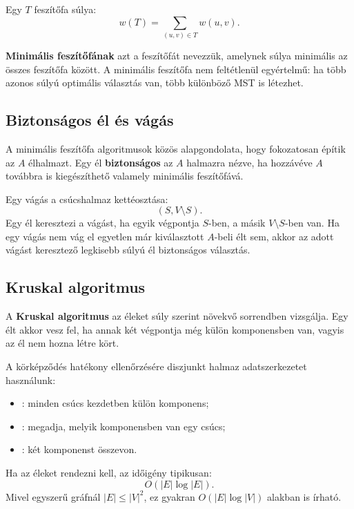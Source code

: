 Egy $T$ feszítőfa súlya:
\[
w(T)=\sum_{(u,v)\in T} w(u,v).
\]

\textbf{Minimális feszítőfának} azt a feszítőfát nevezzük, amelynek súlya minimális az összes feszítőfa között. A minimális feszítőfa nem feltétlenül egyértelmű: ha több azonos súlyú optimális választás van, több különböző MST is létezhet.

\subsection{Biztonságos él és vágás}

A minimális feszítőfa algoritmusok közös alapgondolata, hogy fokozatosan építik az $A$ élhalmazt. Egy él \textbf{biztonságos} az $A$ halmazra nézve, ha hozzávéve $A$ továbbra is kiegészíthető valamely minimális feszítőfává.

Egy vágás a csúcshalmaz kettéosztása:
\[
(S,V\setminus S).
\]
Egy él keresztezi a vágást, ha egyik végpontja $S$-ben, a másik $V\setminus S$-ben van. Ha egy vágás nem vág el egyetlen már kiválasztott $A$-beli élt sem, akkor az adott vágást keresztező legkisebb súlyú él biztonságos választás.



\subsection{Kruskal algoritmus}

A \textbf{Kruskal algoritmus} az éleket súly szerint növekvő sorrendben vizsgálja. Egy élt akkor vesz fel, ha annak két végpontja még külön komponensben van, vagyis az él nem hozna létre kört.

A körképződés hatékony ellenőrzésére diszjunkt halmaz adatszerkezetet használunk:

\begin{itemize}
  \item {}: minden csúcs kezdetben külön komponens;
  \item {}: megadja, melyik komponensben van egy csúcs;
  \item {}: két komponenst összevon.
\end{itemize}


Ha az éleket rendezni kell, az időigény tipikusan:
\[
O(|E|\log |E|).
\]
Mivel egyszerű gráfnál $|E|\leq |V|^2$, ez gyakran $O(|E|\log |V|)$ alakban is írható.


